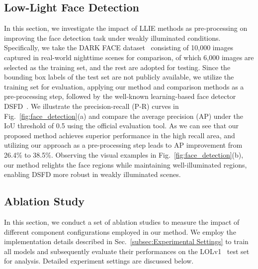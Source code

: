 \subsection{Low-Light Face Detection}\label{subsec:Low-Light Face Detection}
In this section, we investigate the impact of LLIE methods as pre-processing on improving the face detection task under weakly illuminated conditions. Specifically, we take the DARK FACE dataset~\cite{DarkFace} consisting of 10,000 images captured in real-world nighttime scenes for comparison, of which 6,000 images are selected as the training set, and the rest are adopted for testing. Since the bounding box labels of the test set are not publicly available, we utilize the training set for evaluation, applying our method and comparison methods as a pre-processing step, followed by the well-known learning-based face detector DSFD~\cite{DSFD}. We illustrate the precision-recall (P-R) curves in Fig.~\ref{fig:face_detection}(a) and compare the average precision (AP) under the IoU threshold of 0.5 using the official evaluation tool. As we can see that our proposed method achieves superior performance in the high recall area, and utilizing our approach as a pre-processing step leads to AP improvement from 26.4\% to 38.5\%. Observing the visual examples in Fig.~\ref{fig:face_detection}(b), our method relights the face regions while maintaining well-illuminated regions, enabling DSFD more robust in weakly illuminated scenes.

\subsection{Ablation Study}\label{subsec:Ablation Study}
In this section, we conduct a set of ablation studies to measure the impact of different component configurations employed in our method. We employ the implementation details described in Sec.~\ref{subsec:Experimental Settings} to train all models and subsequently evaluate their performances on the LOLv1~\cite{RetinexNet} test set for analysis. Detailed experiment settings are discussed below.


